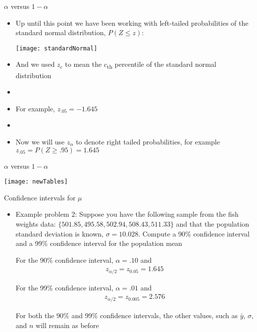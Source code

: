 \documentclass[xcolor=dvipsnames]{beamer}
\begin{document}
\begin{frame}{$\alpha$ versus $1-\alpha$}
	\begin{itemize}
		\item Up until this point we have been working with left-tailed probabilities of the standard normal distribution, $P(Z \leq z)$:
		\begin{center}
			\texttt{[image: standardNormal]}
		\end{center}  \pause
		\item And we used $z_c$ to mean the $c$\textsubscript{th} percentile of the standard normal distribution  \pause
		\item[]
		\item For example, $z_{.05} = -1.645$  \pause
		\item[]
		\item Now we will use $z_{\alpha}$ to denote right tailed probabilities, for example $z_{.05}=P(Z\geq .95) = 1.645$
	\end{itemize}
\end{frame}

\begin{frame}{$\alpha$ versus $1-\alpha$}
	\begin{center}
		\texttt{[image: newTables]}
	\end{center}
\end{frame}

\begin{frame}{Confidence intervals for $\mu$}
	\begin{itemize}
		\item Example problem 2: Suppose you have the following sample from the fish weights data: $\{501.85, 495.58, 502.94, 508.43, 511.33 \}$ and that the population standard deviation is known, $\sigma = 10.028$. Compute a 90\% confidence interval and a 99\% confidence interval for the population mean\\  \vspace{10pt}  \pause
		
		For the 90\% confidence interval, $\alpha = .10$ and 
		\begin{gather*}
			z_{\alpha / 2} = z_{0.05} = 1.645
		\end{gather*} \pause
		
		For the 99\% confidence interval, $\alpha = .01$ and 
		\begin{gather*}
		z_{\alpha / 2} = z_{0.005} = 2.576
		\end{gather*}  \pause
		
		For both the 90\% and 99\% confidence intervals, the other values, such as $\bar{y}$, $\sigma$, and $n$ will remain as before
	\end{itemize}
\end{frame}
\end{document}
